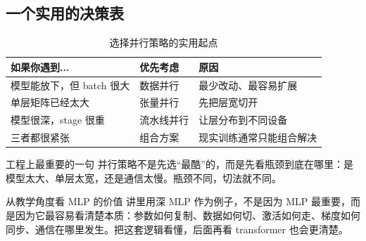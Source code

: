\subsection{一个实用的决策表}

\begin{table}[H]
\centering
\begin{tabular}{p{3.1cm}p{3.8cm}p{4.5cm}}
\toprule
\textbf{如果你遇到...} & \textbf{优先考虑} & \textbf{原因} \\
\midrule
模型能放下，但 batch 很大 & 数据并行 & 最少改动、最容易扩展 \\
单层矩阵已经太大 & 张量并行 & 先把层宽切开 \\
模型很深，stage 很重 & 流水线并行 & 让层分布到不同设备 \\
三者都很紧张 & 组合方案 & 现实训练通常只能组合解决 \\
\bottomrule
\end{tabular}
\caption{选择并行策略的实用起点}
\end{table}

\begin{importantbox}{工程上最重要的一句}
并行策略不是先选“最酷”的，而是先看瓶颈到底在哪里：是模型太大、单层太宽，还是通信太慢。瓶颈不同，切法就不同。
\end{importantbox}

\begin{knowledgebox}{从教学角度看 MLP 的价值}
讲里用深 MLP 作为例子，不是因为 MLP 最重要，而是因为它最容易看清楚本质：参数如何复制、数据如何切、激活如何走、梯度如何同步、通信在哪里发生。把这套逻辑看懂，后面再看 transformer 也会更清楚。
\end{knowledgebox}

